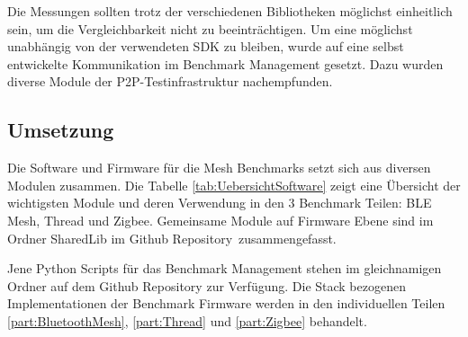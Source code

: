 Die Messungen sollten trotz der verschiedenen Bibliotheken möglichst einheitlich sein, um die Vergleichbarkeit nicht zu beeinträchtigen. Um eine möglichst unabhängig von der verwendeten SDK zu bleiben, wurde auf eine selbst entwickelte Kommunikation im Benchmark Management gesetzt. Dazu wurden  diverse Module der P2P-Testinfrastruktur nachempfunden. 


\subsection{Umsetzung}\label{subsec:Software_Umsetzung}


Die Software und Firmware für die Mesh Benchmarks setzt sich aus diversen Modulen zusammen. Die Tabelle \ref{tab:UebersichtSoftware} zeigt eine Übersicht der wichtigsten Module und deren Verwendung in den 3 Benchmark Teilen: BLE Mesh, Thread und Zigbee.
Gemeinsame Module auf Firmware Ebene sind im Ordner SharedLib im Github Repository\footnotemark\ zusammengefasst.

Jene Python Scripts für das Benchmark Management stehen im gleichnamigen Ordner auf dem Github Repository zur Verfügung.
Die Stack bezogenen Implementationen der Benchmark Firmware werden in den individuellen Teilen \ref{part:BluetoothMesh}, \ref{part:Thread} und \ref{part:Zigbee} behandelt.



